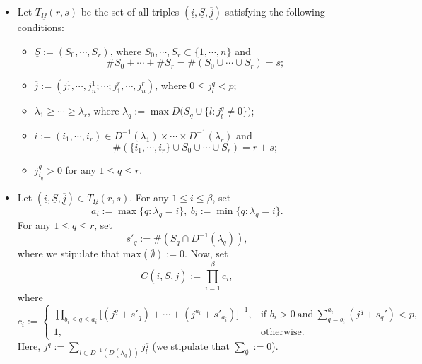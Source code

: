\documentclass[12pt, a4paper]{article}
\begin{document}
\begin{itemize}
\item Let $T_{\underline\Omega}(r,s)$ be the set of all triples $(\underline i,\underline S,\underline{\overline j})$ satisfying the following conditions:
\begin{itemize}
    \item $\underline S:=(S_0,\cdots,S_r)$, where $S_0,\cdots,S_r\subset\{1,\cdots,n\}$ and 
    $$\#S_0+\cdots+\#S_r=\#(S_0\cup\cdots\cup S_r)=s;$$
    \item $\underline{\overline j}:=(j^1_1,\cdots,j^1_n;\cdots;j^r_1,\cdots,j^r_n)$, where $0\leq j^q_l<p$;
    \item $\lambda_1\geq\cdots\geq\lambda_r$, where $\lambda_q := \max D( S_q \cup \{ l : j^q_l \neq 0 \} \big)$;
    \item $\underline i:=(i_1,\cdots,i_r)\in D^{-1}(\lambda_1)\times\cdots\times D^{-1}(\lambda_r)$ and
    $$
    \#(\{i_1,\cdots,i_r\}\cup S_0\cup\cdots\cup S_r)=r+s;
    $$
    \item $j^q_{i_q}>0$ for any $1\leq q\leq r$.
\end{itemize}
    \item Let  \((\underline i,\underline S, \underline{\overline{j}})\in T_{\underline\Omega}(r,s) \).  For any \( 1 \leq i \leq \beta \), set  
\[
a_i := \max  \{q:\lambda_q = i \}  ,~ 
b_i := \min \{ q : \lambda_q = i \}.
\]
For any $1\leq q\leq r$, set 
$$s'_q := \# ( S_q \cap D^{-1}(\lambda_q)),$$
where we stipulate that $\mathrm{max}(\emptyset):=0$.
Now, set  
\begin{equation}\label{C}
C(\underline i,\underline S, \underline{\overline{j}}) := \prod_{i=1}^\beta c_i,
\end{equation}  
where  
\[
c_i := 
\begin{cases}
\prod_{b_i \leq q \leq a_i} \Big[ (j^q + s'_q) + \cdots + (j^{a_i} + s'_{a_i}) \Big]^{-1}, & \text{if } b_i > 0~\mathrm{and}~\sum_{q=b_i}^{a_i}(j^q+s_q')<p, \\
1, & \text{otherwise}.
\end{cases}
\]  
Here,  \( j^q := \sum_{l \in D^{-1}(D(\lambda_q))} j^q_l \) (we stipulate that $\sum_\emptyset:=0$). 


\end{itemize}
\end{document}

